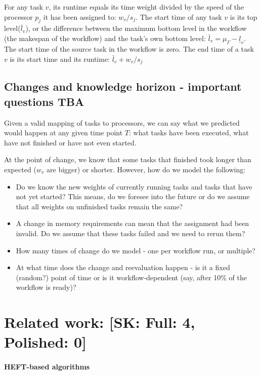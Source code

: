 \documentclass[conference]{IEEEtran}
\newcommand{\bottomlevel}[1]{\underline{l}_{#1}} %
\newcommand{\skug}[1]{{\color{blue}[SK: #1]}}
\begin{document}
    For any task $v$, its runtime equals its time weight divided by the speed of the processor $p_j$ it has been assigned to: $w_v/s_j$.
    The start time of any task $v$ is its top level($\bar{l}_v$), or the difference between the maximum bottom level in the workflow (the makespan of the workflow) and the task's own bottom level: $\bar{l}_v = \mu_\Gamma - \bottomlevel{v}$.
    The start time of the source task in the workflow is zero.
    The end time of a task $v$ is its start time and its runtime: $\bar{l}_v + w_v/s_j$

    \subsection{Changes and knowledge horizon - important questions TBA}

    Given a valid mapping of tasks to processors, we can say what we predicted would happen at any given time point $T$: what tasks have been executed, what have not finished or have not even started.

    At the point of change, we know that some tasks that finished took longer than expected ($w_v$ are bigger) or shorter.
    However, how do we model the following:
    \begin{itemize}
        \item Do we know the new weights of currently running tasks and tasks that have not yet started? This means, do we foresee into the future or do we assume that all weights on unfinished tasks remain the same?
        \item A change in memory requirements can mean that the assignment had been invalid. Do we assume that these tasks failed and we need to rerun them?
        \item How many times of change do we model - one per workflow run, or multiple?
        \item At what time does the change and reevaluation happen - is it a fixed (random?) point of time or is it workflow-dependent (say, after 10\% of the workflow is ready)?
    \end{itemize}


    \section{Related work: \skug{Full: 4, Polished: 0}}

    \paragraph{HEFT-based algorithms}
\end{document}
